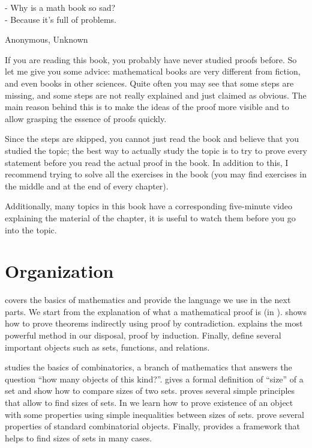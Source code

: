 \epigraph{
    - Why is a math book so sad? \\
    - Because it's full of problems.
}{Anonymous, Unknown}


If you are reading this book, you probably have never studied proofs before.
So let me give you some advice: mathematical books are very different from
fiction, and even books in other sciences. Quite often you may see that some
steps are missing, and some steps are not really explained and just claimed as
obvious. The main reason behind this is to make the ideas of the proof more
visible and to allow grasping the essence of proofs quickly.

Since the steps are skipped, you cannot just read the book and believe that you
studied the topic; the best way to actually study the topic is to try to prove
every statement before you read the actual proof in the book. In addition to
this, I recommend trying to solve all the exercises in the book (you may find
exercises in the middle and at the end of every chapter).

Additionally, many topics in this book have a corresponding five-minute video
explaining the material of the chapter, it is useful to watch them before you go
into the topic.

\section*{Organization}
 covers the basics of mathematics and
provide the language we use in the next parts. We start from the explanation of
what a mathematical proof is (in ).
 shows how to prove theorems indirectly
using proof by contradiction.  explains the most
powerful method in our disposal, proof by induction. Finally,
define several important objects such as sets, functions, and relations.

 studies the basics of combinatorics, a branch of
mathematics that answers the question ``how many objects of this kind?''.
 gives a formal
definition of ``size'' of a set and show how to compare sizes of two sets.
 proves several simple principles that allow to
find sizes of sets. In  we learn how to prove existence
of an object with some properties using simple inequalities between sizes of
sets.  prove
several properties of standard combinatorial objects. Finally,
 provides a framework that helps to find
sizes of sets in many cases.

